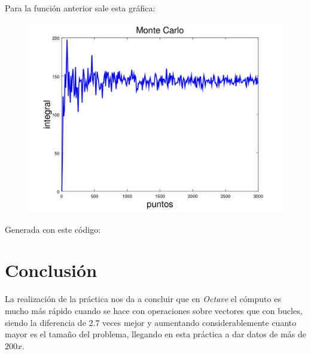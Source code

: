 \documentclass{article}
\begin{document}
Para la función anterior sale esta gráfica:
\begin{figure}[h]
\centering
\includegraphics[width=12cm]{estudio}
\end{figure}

Generada con este código:


\section{Conclusión}
La realización de la práctica nos da a concluir que en {\it Octave} el 
cómputo es mucho más rápido cuando se hace con operaciones sobre 
vectores que con bucles, siendo la diferencia de $2.7$ veces mejor y 
aumentando considerablemente cuanto mayor es el tamaño del problema, 
llegando en esta práctica a dar datos de más de $200x$.
\end{document}
